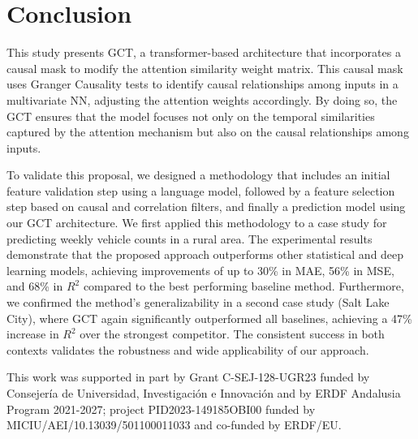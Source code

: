 \documentclass[acmsmall]{acmart}
\begin{document}
\section{Conclusion} \label{sec:conclusions}

This study presents {\color{blue}GCT}, a transformer-based architecture that incorporates a causal mask to modify the attention similarity weight matrix. This causal mask uses Granger Causality tests to identify causal relationships among inputs in a multivariate NN, adjusting the attention weights accordingly. By doing so, the GCT ensures that the model focuses not only on the temporal similarities captured by the attention mechanism but also on the causal relationships among inputs.


To validate this proposal, we designed a methodology that includes an initial feature validation step using a language model, followed by a feature selection step based on causal and correlation filters, and finally a prediction model using our GCT architecture. {\color{black} We first applied this methodology to a case study for predicting weekly vehicle counts in a rural area.} The experimental results demonstrate that the proposed approach outperforms other statistical and deep learning models, achieving improvements of up to 30\% in MAE, 56\% in MSE, and 68\% in $R^2$ compared to the best performing baseline method. {\color{black} Furthermore, we confirmed the method's generalizability in a second case study (Salt Lake City), where GCT again significantly outperformed all baselines, achieving a 47\% increase in $R^2$ over the strongest competitor. The consistent success in both contexts validates the robustness and wide applicability of our approach.}


\begin{acks}
This work was supported in part by Grant C-SEJ-128-UGR23 funded by Consejería de Universidad, Investigación e Innovación and by ERDF Andalusia Program 2021-2027; project PID2023-149185OBI00 funded by MICIU/AEI/10.13039/501100011033 and co-funded by ERDF/EU.
\end{acks}





\end{document}
